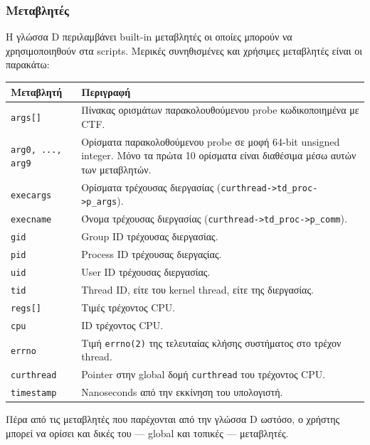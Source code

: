 \documentclass[12pt]{article}
\begin{document}
\subsubsection{Μεταβλητές}

Η γλώσσα D περιλαμβάνει built-in μεταβλητές οι οποίες μπορούν να
χρησιμοποιηθούν στα scripts. Μερικές συνηθισμένες και χρήσιμες μεταβλητές είναι
οι παρακάτω:

\begin{center}
\begin{tabular}{|p{9cm}|p{9cm}|}
	\hline
	\textbf{Μεταβλητή} & \textbf{Περιγραφή} \\
	\hline
	\lstinline{args[]} & Πίνακας ορισμάτων παρακολουθούμενου probe
		κωδικοποιημένα με CTF. \\
	\hline
	\lstinline{arg0, ..., arg9} & Ορίσματα παρακολοθούμενου probe σε μοφή
		64-bit unsigned integer. Μόνο τα πρώτα 10 ορίσματα είναι
		διαθέσιμα μέσω αυτών των μεταβλητών. \\
	\hline
	\lstinline{execargs} & Ορίσματα τρέχουσας διεργασίας
		(\lstinline{curthread->td_proc->p_args}). \\
	\hline
	\lstinline{execname} & Όνομα τρέχουσας διεργασίας
		(\lstinline{curthread->td_proc->p_comm}). \\
	\hline
	\lstinline{gid} & Group ID τρέχουσας διεργασίας. \\
	\hline
	\lstinline{pid} & Process ID τρέχουσας διεργαςίας. \\
	\hline
	\lstinline{uid} & User ID τρέχουσας διεργασίας. \\
	\hline
	\lstinline{tid} & Thread ID, είτε του kernel thread, είτε της
		διεργασίας. \\
	\hline
	\lstinline{regs[]} & Τιμές τρέχοντος CPU. \\
	\hline
	\lstinline{cpu} & ID τρέχοντος CPU. \\
	\hline
	\lstinline{errno} & Τιμή \lstinline{errno(2)} της τελευταίας κλήσης
		συστήματος στο τρέχον thread. \\
	\hline
	\lstinline{curthread} & Pointer στην global δομή \lstinline{curthread}
		του τρέχοντος CPU. \\
	\hline
	\lstinline{timestamp} & Nanoseconds από την εκκίνηση του υπολογιστή. \\
	\hline
\end{tabular}
\end{center}

Πέρα από τις μεταβλητές που παρέχονται από την γλώσσα D ωστόσο, ο χρήστης
μπορεί να ορίσει και δικές του --- global και τοπικές --- μεταβλητές.
\end{document}
